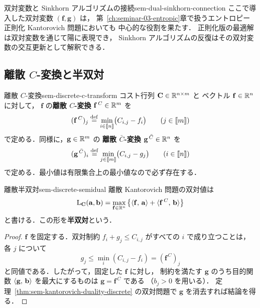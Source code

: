 \begin{remark}{双対変数と Sinkhorn アルゴリズムの接続}{sem-dual-sinkhorn-connection}
  ここで導入した双対変数 $(\mathbf{f}, \mathbf{g})$ は，
  第~\ref{ch:seminar-03-entropic}章で扱うエントロピー正則化 Kantorovich 問題においても
  中心的な役割を果たす．
  正則化版の最適解は双対変数を通じて陽に表現でき，
  Sinkhorn アルゴリズムの反復はその双対変数の交互更新として解釈できる．
\end{remark}

\subsection{離散 $C$-変換と半双対}
\label{subsec:sem-discrete-c-transform}

\begin{definition}{離散 $C$-変換}{sem-discrete-c-transform}
  コスト行列 $\mathbf{C} \in \mathbb{R}^{n \times m}$ と
  ベクトル $\mathbf{f} \in \mathbb{R}^n$ に対して，
  $\mathbf{f}$ の\textbf{離散 $C$-変換}
  $\mathbf{f}^{\,C} \in \mathbb{R}^m$ を
  \[
    (\mathbf{f}^{\,C})_j
    \overset{\mathrm{def}}{=}
    \min_{i \in \llbracket n \rrbracket} \bigl(C_{i,j} - f_i\bigr)
    \qquad (j \in \llbracket m \rrbracket)
  \]
  で定める．同様に，$\mathbf{g} \in \mathbb{R}^m$ の
  \textbf{離散 $\bar C$-変換} $\mathbf{g}^{\,\bar C} \in \mathbb{R}^n$ を
  \[
    (\mathbf{g}^{\,\bar C})_i
    \overset{\mathrm{def}}{=}
    \min_{j \in \llbracket m \rrbracket} \bigl(C_{i,j} - g_j\bigr)
    \qquad (i \in \llbracket n \rrbracket)
  \]
  で定める．最小値は有限集合上の最小値なので必ず存在する．
\end{definition}

\begin{claim}{離散半双対}{sem-discrete-semidual}
  離散 Kantorovich 問題の双対値は
  \[
    \mathrm{L}_{\mathbf{C}}(\mathbf{a}, \mathbf{b})
    =
    \max_{\mathbf{f} \in \mathbb{R}^n}
    \left\{
      \langle \mathbf{f},\, \mathbf{a} \rangle
      + \langle \mathbf{f}^{\,C},\, \mathbf{b} \rangle
    \right\}
  \]
  と書ける．この形を\textbf{半双対}という．
\end{claim}

\begin{proof}
  $\mathbf{f}$ を固定する．双対制約
  $f_i + g_j \leq C_{i,j}$ がすべての $i$ で成り立つことは，
  各 $j$ について
  \[
    g_j \leq \min_i (C_{i,j} - f_i) = (\mathbf{f}^{\,C})_j
  \]
  と同値である．したがって，固定した $\mathbf{f}$ に対し，
  制約を満たす $\mathbf{g}$ のうち目的関数
  $\langle \mathbf{g},\, \mathbf{b} \rangle$ を最大にするものは
  $\mathbf{g} = \mathbf{f}^{\,C}$ である
  （$b_j > 0$ を用いる）．
  定理~\ref{thm:sem-kantorovich-duality-discrete} の双対問題で
  $\mathbf{g}$ を消去すれば結論を得る．
\end{proof}

